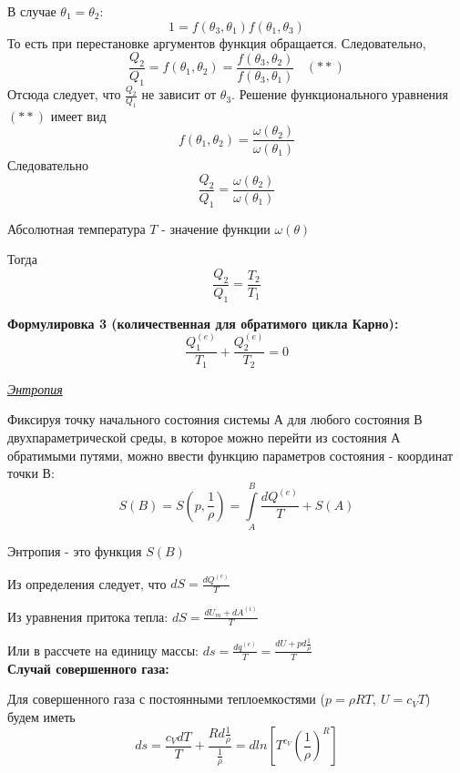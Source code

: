 В случае $\theta_1 = \theta_2$:
$$ 1 = f(\theta_3, \theta_1)f(\theta_1, \theta_3) $$
То есть при перестановке аргументов функция обращается. Следовательно, 
$$ \frac{Q_2}{Q_1} = f(\theta_1, \theta_2) = \frac{f(\theta_3, \theta_2)}{f(\theta_3, \theta_1)} \ \ \ \ (**)$$
Отсюда следует, что $\frac{Q_2}{Q_1}$ не зависит от $\theta_3$.  Решение функционального уравнения $(**)$ имеет вид
$$ f(\theta_1, \theta_2) = \frac{\omega(\theta_2)}{\omega(\theta_1)} $$
Следовательно $$ \frac{Q_2}{Q_1} = \frac{\omega(\theta_2)}{\omega(\theta_1)} $$

\begin{defn}
	Абсолютная температура $T$ - значение функции $\omega(\theta)$
\end{defn}

Тогда $$ \frac{Q_2}{Q_1} = \frac{T_2}{T_1} $$

\textbf{Формулировка 3 (количественная для обратимого цикла Карно):} 
$$ \frac{Q_1^{(e)}}{T_1} + \frac{Q_2^{(e)}}{T_2} = 0 $$

\begin{center}
	\textit{\underline{Энтропия}}
\end{center}

Фиксируя точку начального состояния системы А для любого состояния В двухпараметрической среды, в которое можно перейти из состояния А обратимыми путями, можно ввести функцию параметров состояния - координат точки В:
$$ S(B) = S\left(p, \frac{1}{\rho}\right) = \int\limits_{A}^{B}\frac{dQ^{(e)}}{T} + S(A) $$

\begin{defn}
	 Энтропия - это функция $S(B)$
\end{defn}

Из определения следует, что $\displaystyle dS = \frac{dQ^{(e)}}{T} $

Из уравнения притока тепла:
$\displaystyle dS = \frac{dU_m + dA^{(i)}}{T} $

Или в рассчете на единицу массы:
$\displaystyle ds = \frac{dq^{(e)}}{T} = \frac{dU + pd\frac{1}{\rho}}{T} $  \\
\textbf{Случай совершенного газа:}

Для совершенного газа с постоянными теплоемкостями ($p = \rho R T, \ U = c_V T$) будем иметь
$$ ds = \frac{c_VdT}{T} + \frac{Rd\frac{1}{\rho}}{\frac{1}{\rho}} = dln\left[T^{c_V}\left( \frac{1}{\rho} \right)^{R}\right] $$





